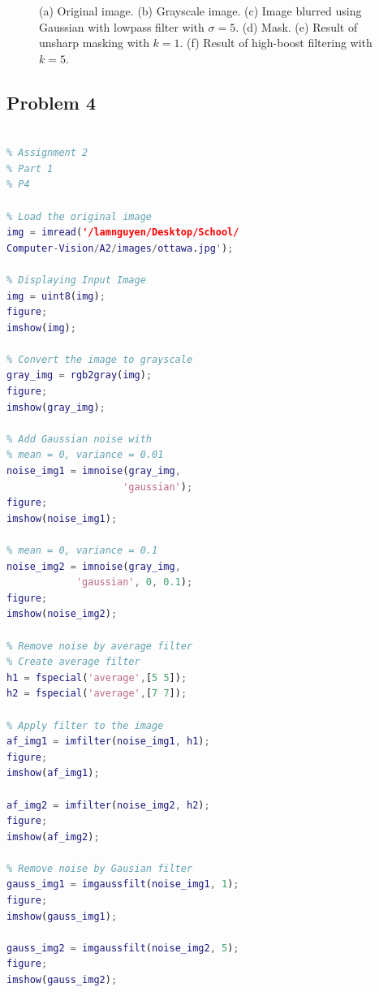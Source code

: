 \documentclass[conference]{IEEEtran}
\begin{document}
\begin{figure}[h!]
\begin{subfigure}[b]{0.3\linewidth}
\caption{}
\end{subfigure}
\caption{(a) Original image. (b) Grayscale image. (c) Image blurred using Gaussian with lowpass filter with \({\sigma} = 5\). (d) Mask. (e) Result of unsharp masking with \(k = 1\). (f) Result of high-boost filtering with \(k = 5\).}
\label{fig:image sharpening}
\end{figure}

\clearpage
\subsection{Problem 4}

\begin{lstlisting}[language=Matlab]

% Assignment 2
% Part 1
% P4

% Load the original image
img = imread('/lamnguyen/Desktop/School/
Computer-Vision/A2/images/ottawa.jpg');

% Displaying Input Image
img = uint8(img);
figure; 
imshow(img); 

% Convert the image to grayscale
gray_img = rgb2gray(img);
figure; 
imshow(gray_img);

% Add Gaussian noise with 
% mean = 0, variance = 0.01
noise_img1 = imnoise(gray_img, 
                    'gaussian');
figure; 
imshow(noise_img1);

% mean = 0, variance = 0.1
noise_img2 = imnoise(gray_img, 
            'gaussian', 0, 0.1);
figure; 
imshow(noise_img2);

% Remove noise by average filter
% Create average filter
h1 = fspecial('average',[5 5]);
h2 = fspecial('average',[7 7]);

% Apply filter to the image
af_img1 = imfilter(noise_img1, h1);
figure; 
imshow(af_img1);

af_img2 = imfilter(noise_img2, h2);
figure; 
imshow(af_img2);

% Remove noise by Gausian filter
gauss_img1 = imgaussfilt(noise_img1, 1);
figure; 
imshow(gauss_img1);

gauss_img2 = imgaussfilt(noise_img2, 5);
figure; 
imshow(gauss_img2);

\end{lstlisting}
\end{document}
